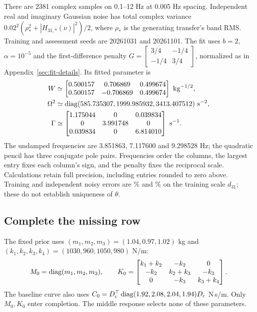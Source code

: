 There are 2381 complex samples on 0.1--12 Hz at 0.005 Hz spacing.
Independent real and imaginary Gaussian noise has total complex variance
$0.02^2(\rho_*^2+|H_{31,*}(\nu)|^2)/2$, where $\rho_*$ is the generating
transfer's band RMS. Training and assessment seeds are 20261031 and 20261101.
The fit uses $b=2$, $\alpha=10^{-5}$ and the first-difference penalty
$G=\left[\begin{smallmatrix}3/4&-1/4\\-1/4&3/4\end{smallmatrix}\right]$, normalized as in Appendix~\ref{sec:fit-details}.
Its fitted parameter is
\begin{equation}
 \begin{aligned}
 W&\simeq\begin{bmatrix}0.500157 & 0.706869 & 0.499674\\0.500157 & -0.706869 & 0.499674\end{bmatrix}\ \mathrm{kg}^{-1/2},\\
 \Omega^{2}&\simeq\operatorname{diag}(585.735307, 1999.985932, 3413.407512)\ \mathrm{s}^{-2},\\
 \Gamma&\simeq\begin{bmatrix}1.175044 & 0 & 0.039834\\0 & 3.991748 & 0\\0.039834 & 0 & 6.814010\end{bmatrix}\ \mathrm{s}^{-1}.
 \end{aligned}
 \label{eq:spring-factors}
\end{equation}
The undamped frequencies are 3.851863, 7.117600 and 9.298528 Hz;
the quadratic pencil has three conjugate pole pairs. Frequencies order the
columns, the largest entry fixes each column's sign, and the penalty fixes
the reciprocal scale. Calculations retain full precision, including entries
rounded to zero above. Training and independent noisy errors are
\SpringTrainingError\% and \SpringIndependentError\% on the training scale
$d_{31}$; these do not establish uniqueness of $\theta$.

\subsection{Complete the missing row}
The fixed prior uses $(m_1,m_2,m_3)=(1.04,0.97,1.02)$ kg and
$(k_1,k_2,k_3,k_4)=(1030,960,1050,980)$ N/m:
\begin{equation}
 M_0=\operatorname{diag}(m_1,m_2,m_3),\qquad
 K_0=\begin{bmatrix}
 k_1+k_2&-k_2&0\\-k_2&k_2+k_3&-k_3\\0&-k_3&k_3+k_4
 \end{bmatrix}.
 \label{eq:spring-prior}
\end{equation}
The baseline curve also uses
$C_0=D_{\rm c}^{\top}\operatorname{diag}(1.92,2.08,2.04,1.94)D_{\rm c}$ N\,s/m.
Only $M_0,K_0$ enter completion. The middle response selects none of these
parameters.

